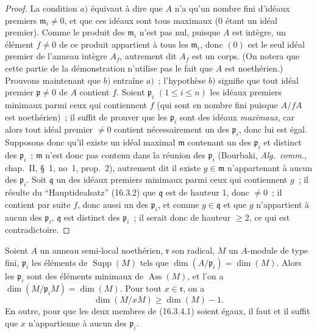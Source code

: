 \begin{proof}
La condition $a)$ équivaut à dire que $A$ n'a qu'un nombre fini d'idéaux
premiers $\mathfrak{m}_i\neq0$, et que ces idéaux sont tous maximaux ($0$ étant
un idéal premier). Comme le produit des $\mathfrak{m}_i$ n'est pas nul, puisque
$A$ est intègre, un élément $f\neq0$ de ce produit appartient à tous les
$\mathfrak{m}_i$, donc $(0)$ est le seul idéal premier de l'anneau intègre
$A_f$, autrement dit $A_f$ est un corps. (On notera que cette partie de la
démonstration n'utilise pas le fait que $A$ est noethérien.) Prouvons
maintenant que $b)$ entraîne $a)$~; l'hypothèse $b)$ signifie que tout idéal
premier $\mathfrak{p}\neq0$ de $A$ contient $f$. Soient $\mathfrak{p}_i$
$(1\leq i\leq n)$ les idéaux premiers minimaux parmi ceux qui contiennent $f$
(qui sont en nombre fini puisque $A/fA$ est noethérien)~; il suffit de prouver
que les $\mathfrak{p}_i$ sont des idéaux \emph{maximaux}, car alors tout idéal
premier $\neq0$ contient nécessairement un des $\mathfrak{p}_i$, donc lui est
égal. Supposons donc qu'il existe un idéal maximal $\mathfrak{m}$ contenant un
des $\mathfrak{p}_i$ et distinct des $\mathfrak{p}_i$~; $\mathfrak{m}$ n'est
donc pas contenu dans la réunion des $\mathfrak{p}_i$ (Bourbaki,
\emph{Alg.~comm.}, chap.~II, \S~1, no~1, prop.~2), autrement dit il existe
$g\in\mathfrak{m}$ n'appartenant à aucun des $\mathfrak{p}_i$. Soit
$\mathfrak{q}$ un des idéaux premiers minimaux parmi ceux qui contiennent
$g$~; il résulte du ``Hauptidealsatz'' (16.3.2) que $\mathfrak{q}$ est de
hauteur 1, donc $\neq0$~; il contient par suite $f$, donc aussi un des
$\mathfrak{p}_i$, et comme $g\in\mathfrak{q}$ et que $g$ n'appartient à aucun
des $\mathfrak{p}_i$, $\mathfrak{q}$ est distinct des $\mathfrak{p}_i$~; il
serait donc de hauteur $\geq2$, ce qui est contradictoire.
\end{proof}

\begin{proposition}[16.3.4]
\label{0.16.3.4-fr}
Soient $A$ un anneau semi-local noethérien, $\mathfrak{r}$ son radical, $M$ un
$A$-module de type fini, $\mathfrak{p}_i$ les éléments de
$\operatorname{Supp}(M)$ tels que
$\dim(A/\mathfrak{p}_i)=\dim(M)$. Alors les $\mathfrak{p}_i$ sont des éléments
minimaux de $\operatorname{Ass}(M)$, et l'on a
$\dim(M/\mathfrak{p}_iM)=\dim(M)$. Pour tout $x\in\mathfrak{r}$, on a
\begin{equation}
\label{0.16.3.4.1-fr}
\tag{16.3.4.1}
  \dim(M/xM)\geq\dim(M)-1.
\end{equation}
En outre, pour que les deux membres de (16.3.4.1) soient égaux, il faut et il
suffit que $x$ n'appartienne à aucun des $\mathfrak{p}_i$.
\end{proposition}

